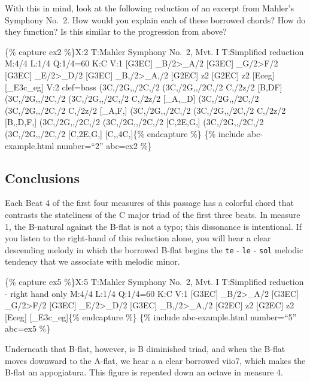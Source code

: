 \documentclass{book}
\begin{document}
With this in mind, look at the following reduction of an excerpt from Mahler's
Symphony No.~2. How would you explain each of these borrowed chords? How do
they function? Is this similar to the progression from above?

\{\% capture ex2 \%\}X:2 T:Mahler Symphony No.~2, Mvt. I T:Simplified
reduction M:4/4 L:1/4 Q:1/4=60 K:C V:1 {[}G3EC{]}
\_B/2\textgreater\_A/2\textbar{} {[}G3EC{]} \_G/2\textgreater F/2\textbar{}
{[}G3EC{]} \_E/2\textgreater\_D/2\textbar{} {[}G3EC{]}
\_B,/2\textgreater\_A,/2\textbar{} {[}G2EC{]} z2\textbar{} {[}G2EC{]}
z2\textbar{} {[}Eceg{]} {[}\_E3c\_eg{]}\textbar{]} V:2 clef=bass
(3C,/2G,,/2C,/2 (3C,/2G,,/2C,/2 C,/2z/2 {[}B,DF{]}\textbar{} (3C,/2G,,/2C,/2
(3C,/2G,,/2C,/2 C,/2z/2 {[}\_A,\_D{]}\textbar{} (3C,/2G,,/2C,/2
(3C,/2G,,/2C,/2 C,/2z/2 {[}\_A,F,{]}\textbar{} (3C,/2G,,/2C,/2 (3C,/2G,,/2C,/2
C,/2z/2 {[}B,,D,F,{]}\textbar{} (3C,/2G,,/2C,/2 (3C,/2G,,/2C,/2
{[}C,2E,G,{]}\textbar{} (3C,/2G,,/2C,/2 (3C,/2G,,/2C,/2
{[}C,2E,G,{]}\textbar{} {[}C,,4C,{]}\textbar{]}\{\% endcapture \%\} \{\%
include abc-example.html number=``2'' abc=ex2 \%\}

\hypertarget{conclusions-51}{%
\subsection{Conclusions}\label{conclusions-51}}

Each Beat 4 of the first four measures of this passage has a colorful chord
that contrasts the stateliness of the C major triad of the first three beats.
In measure 1, the B-natural against the B-flat is not a typo; this dissonance
is intentional. If you listen to the right-hand of this reduction alone, you
will hear a clear descending melody in which the borrowed B-flat begins the
\texttt{te} - \texttt{le} - \texttt{sol} melodic tendency that we associate
with melodic minor.

\{\% capture ex5 \%\}X:5 T:Mahler Symphony No.~2, Mvt. I T:Simplified
reduction - right hand only M:4/4 L:1/4 Q:1/4=60 K:C V:1 {[}G3EC{]}
\_B/2\textgreater\_A/2\textbar{} {[}G3EC{]} \_G/2\textgreater F/2\textbar{}
{[}G3EC{]} \_E/2\textgreater\_D/2\textbar{} {[}G3EC{]}
\_B,/2\textgreater\_A,/2\textbar{} {[}G2EC{]} z2\textbar{} {[}G2EC{]}
z2\textbar{} {[}Eceg{]} {[}\_E3c\_eg{]}\textbar{]}\{\% endcapture \%\} \{\%
include abc-example.html number=``5'' abc=ex5 \%\}

Underneath that B-flat, however, is B diminished triad, and when the B-flat
moves downward to the A-flat, we hear a a clear borrowed viio7, which makes
the B-flat an appogiatura. This figure is repeated down an octave in measure
4.
\end{document}

